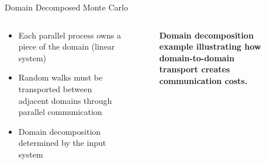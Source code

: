 \documentclass{beamer}
\begin{document}
\begin{frame}{Domain Decomposed Monte Carlo}

  \begin{columns}
    \begin{column}{0.5\textwidth}
      \begin{itemize}
      \item Each parallel process owns a piece of the domain (linear
        system)
        \bigskip
      \item Random walks must be transported between adjacent domains
        through parallel communication
        \bigskip
      \item Domain decomposition determined by the input system
      \end{itemize}
    \end{column}

    \begin{column}{0.5\textwidth}
      \begin{figure}[htpb!]
        \begin{center}
          \scalebox{0.75}{  }
        \end{center}
        \caption{\textbf{Domain decomposition example illustrating how
            domain-to-domain transport creates communication costs.}}
      \end{figure}
    \end{column}
  \end{columns}

\end{frame}
\end{document}
